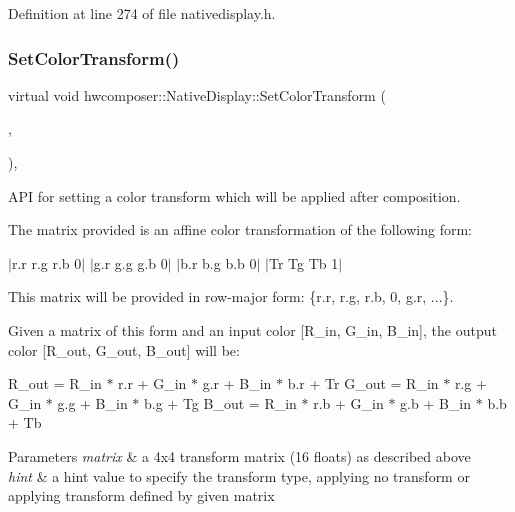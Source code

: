 Definition at line 274 of file nativedisplay.\+h.


\begin{DoxyCode}{0}
\end{DoxyCode}
\mbox{\label{classhwcomposer_1_1NativeDisplay_adcce47013e2de6f18ef7384954a95d4e}} 
\subsubsection{\texorpdfstring{Set\+Color\+Transform()}{SetColorTransform()}}
{\footnotesize\ttfamily virtual void hwcomposer\+::\+Native\+Display\+::\+Set\+Color\+Transform (\begin{DoxyParamCaption}\item[{const float $\ast$}]{,  }\item[{\mbox{\hyperlink{hwcdefs_8h_a1a2c55aec4fbd12a1e323f2bdb3e9b88}{H\+W\+C\+Color\+Transform}}}]{ }\end{DoxyParamCaption})\hspace{0.3cm}{\ttfamily [inline]}, {\ttfamily [virtual]}}

A\+PI for setting a color transform which will be applied after composition.

The matrix provided is an affine color transformation of the following form\+:

$\vert$r.r r.\+g r.\+b 0$\vert$ $\vert$g.r g.\+g g.\+b 0$\vert$ $\vert$b.r b.\+g b.\+b 0$\vert$ $\vert$\+Tr Tg Tb 1$\vert$

This matrix will be provided in row-\/major form\+: \{r.\+r, r.\+g, r.\+b, 0, g.\+r, ...\}.

Given a matrix of this form and an input color \mbox{[}R\+\_\+in, G\+\_\+in, B\+\_\+in\mbox{]}, the output color \mbox{[}R\+\_\+out, G\+\_\+out, B\+\_\+out\mbox{]} will be\+:

R\+\_\+out = R\+\_\+in $\ast$ r.\+r + G\+\_\+in $\ast$ g.\+r + B\+\_\+in $\ast$ b.\+r + Tr G\+\_\+out = R\+\_\+in $\ast$ r.\+g + G\+\_\+in $\ast$ g.\+g + B\+\_\+in $\ast$ b.\+g + Tg B\+\_\+out = R\+\_\+in $\ast$ r.\+b + G\+\_\+in $\ast$ g.\+b + B\+\_\+in $\ast$ b.\+b + Tb


\begin{DoxyParams}{Parameters}
{\em matrix} & a 4x4 transform matrix (16 floats) as described above \\
\hline
{\em hint} & a hint value to specify the transform type, applying no transform or applying transform defined by given matrix \\
\hline
\end{DoxyParams}


